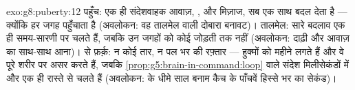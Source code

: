 \begin{solution}{exo:g8:puberty:12}
पहुँच: एक ही संदेशवाहक आवाज़, ,  और मिज़ाज, सब एक साथ बदल देता
है --- क्योंकि  हर जगह पहुँचाता है (अवलोकन: वह तालमेल वाली दोबारा
बनावट)। तालमेल: सारे बदलाव एक ही समय-सारणी पर चलते हैं, जबकि उन जगहों को
कोई  जोड़ती तक नहीं (अवलोकन: दाढ़ी और आवाज़ का साथ-साथ आना)।
 से फ़र्क़: न कोई तार, न पल भर की रफ़्तार --- हुक्मों को महीने
लगते हैं और वे पूरे शरीर पर असर करते हैं, जबकि
\cref{prop:g5:brain-in-command:loop} वाले संदेश मिलीसेकंडों में और एक ही
रास्ते से चलते हैं (अवलोकन:  के धीमे साल बनाम कैच के पाँचवें
हिस्से भर का सेकंड)।
\end{solution}

